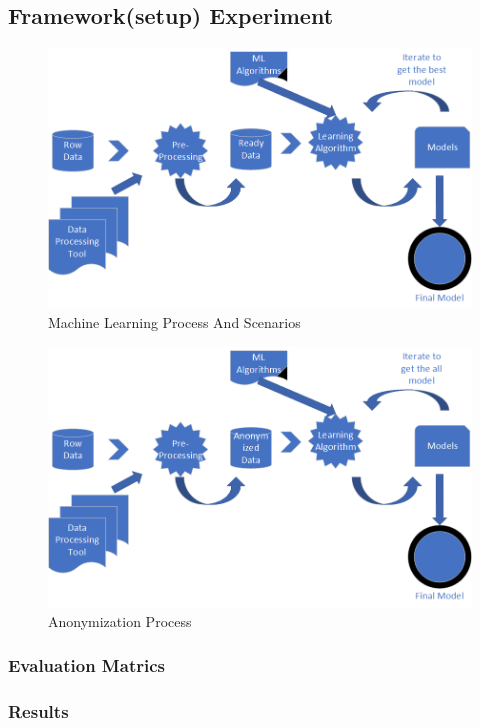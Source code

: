 \subsection{Framework(setup) Experiment}
\begin{figure}[htb!]
    \includegraphics[scale=0.325]{media/framework/ml process.png}
    \caption{Machine Learning Process And Scenarios}
    \label{fig:Machine Learning Process And Scenarios}
    \vspace{0mm}
\end{figure} 
\begin{figure}[htb!]
    \includegraphics[scale=0.325]{media/framework/anonymization framwork.png}
    \caption{Anonymization Process}
    \label{fig:anonymization}
    \vspace{0mm}
\end{figure} 
\subsubsection{Evaluation Matrics}
\subsubsection{Results}




